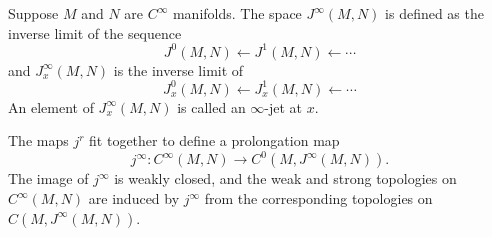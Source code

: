 Suppose $M$ and $N$ are $C^\infty$ manifolds. The space $J^\infty(M,N)$ is defined as the inverse limit of the sequence
$$J^0(M,N) \leftarrow J^1(M,N) \leftarrow \cdots$$
and $J^\infty_x(M,N)$ is the inverse limit of
$$J^0_x(M,N) \leftarrow J^1_x(M,N) \leftarrow \cdots$$
An element of $J^\infty_x(M,N)$ is called an $\infty$-jet at $x$.

The maps $j^r$ fit together to define a prolongation map
$$j^\infty: C^\infty(M,N) \rightarrow C^0(M,J^\infty(M,N)).$$
The image of $j^\infty$ is weakly closed, and the weak and strong topologies on $C^\infty(M,N)$ are induced by $j^\infty$ from the corresponding topologies on $C(M,J^\infty(M,N))$.
